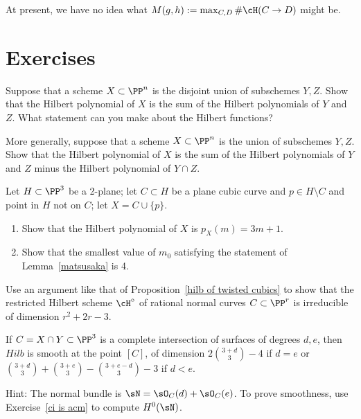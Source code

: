 At present, we have no idea what $M(g,h) := \max_{C, D}\#\cH(C \to D)$ might be.

\section{Exercises}


\begin{exercise}\label{deg of disjoint union}
Suppose that a scheme $X\subset \PP^n$ is the disjoint union of subschemes $Y,Z$. Show that the Hilbert polynomial of
$X$ is the sum of the Hilbert polynomials of $Y$ and $Z$. What statement can you make about the Hilbert functions?
\end{exercise}

\begin{exercise}
More generally, suppose that a scheme $X\subset \PP^n$ is the union of subschemes $Y,Z$. Show that the Hilbert polynomial of
$X$ is the sum of the Hilbert polynomials of $Y$ and $Z$ minus the Hilbert polynomial of $Y\cap Z$. 
\end{exercise}

\begin{exercise}
Let $H \subset \PP^3$ be a 2-plane; let $C \subset H$ be a plane cubic curve and $p \in H \setminus C$ and point in $H$ not on $C$; let $X = C \cup \{p\}$.
\begin{enumerate}
\item Show that the Hilbert polynomial of $X$ is $p_X(m) = 3m+1$.
\item Show that the smallest value of $m_0$ satisfying the statement of Lemma~\ref{matsusaka} is 4.
\end{enumerate}
\end{exercise}

\begin{exercise}\label{rational normal hilbert}
Use an  argument like that of Proposition~\ref{hilb of twisted cubics} to show that the restricted Hilbert scheme $\cH^\circ$ of rational normal curves $C \subset \PP^r$ is irreducible of dimension $r^2+2r-3$.
\end{exercise}

\begin{exercise}\label{hilb at a ci}
If $C = X\cap Y\subset \PP^3$ is a complete intersection of surfaces of degrees $d,e$, then
$Hilb$ is smooth at the point $[C]$, of dimension $2\binom{3+d}{3}-4$ if $d=e$
or $\binom{3+d}{3} +\binom{3+e}{3} -\binom{3+e-d}{3} -3$ if $d<e$.

Hint: The normal bundle is $\sN = \sO_C(d)+\sO_C(e)$. To prove smoothness, use
Exercise~\ref{ci is acm} to compute $H^0(\sN)$.
\end{exercise}

